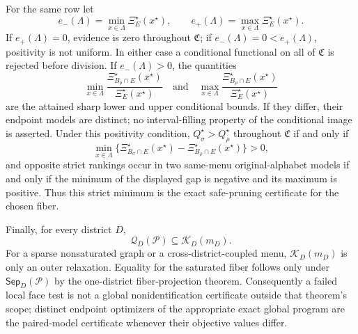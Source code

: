 For the same row let
\[
e_-(\Lambda)=\min_{x\in\Lambda}\Xi_E^\star(x^\star),
\qquad
e_+(\Lambda)=\max_{x\in\Lambda}\Xi_E^\star(x^\star).
\]
If \(e_+(\Lambda)=0\), evidence is zero throughout \(\mathfrak C\); if \(e_-(\Lambda)=0<e_+(\Lambda)\), positivity is not uniform. In either case a conditional functional on all of \(\mathfrak C\) is rejected before division. If \(e_-(\Lambda)>0\), the quantities
\[
\min_{x\in\Lambda}
\frac{\Xi_{B_\rho\cap E}^\star(x^\star)}{\Xi_E^\star(x^\star)}
\quad\text{and}\quad
\max_{x\in\Lambda}
\frac{\Xi_{B_\rho\cap E}^\star(x^\star)}{\Xi_E^\star(x^\star)}
\]
are the attained sharp lower and upper conditional bounds. If they differ, their endpoint models are distinct; no interval-filling property of the conditional image is asserted. Under this positivity condition, \(Q_\sigma^\star>Q_\rho^\star\) throughout \(\mathfrak C\) if and only if
\[
\min_{x\in\Lambda}
\{\Xi_{B_\sigma\cap E}^\star(x^\star)-\Xi_{B_\rho\cap E}^\star(x^\star)\}>0,
\]
and opposite strict rankings occur in two same-menu original-alphabet models if and only if the minimum of the displayed gap is negative and its maximum is positive. Thus this strict minimum is the exact safe-pruning certificate for the chosen fiber.

Finally, for every district \(D\),
\[
\mathcal Q_D(\mathcal P)\subseteq\mathcal K_D(m_D).
\]
For a sparse nonsaturated graph or a cross-district-coupled menu, \(\mathcal K_D(m_D)\) is only an outer relaxation. Equality for the saturated fiber follows only under \(\mathsf{Sep}_D(\mathcal P)\) by the one-district fiber-projection theorem. Consequently a failed local face test is not a global nonidentification certificate outside that theorem's scope; distinct endpoint optimizers of the appropriate exact global program are the paired-model certificate whenever their objective values differ.